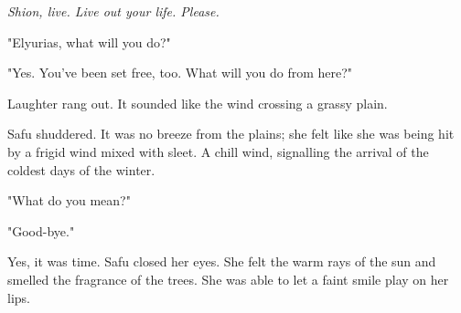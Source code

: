 \emph{Shion, live. Live out your life. Please.}

"Elyurias, what will you do?"


"Yes. You've been set free, too. What will you do from here?"

Laughter rang out. It sounded like the wind crossing a grassy plain.


Safu shuddered. It was no breeze from the plains; she felt like she was
being hit by a frigid wind mixed with sleet. A chill wind, signalling
the arrival of the coldest days of the winter.


"What do you mean?"


"Good-bye."

Yes, it was time. Safu closed her eyes. She felt the warm rays of the
sun and smelled the fragrance of the trees. She was able to let a faint
smile play on her lips.